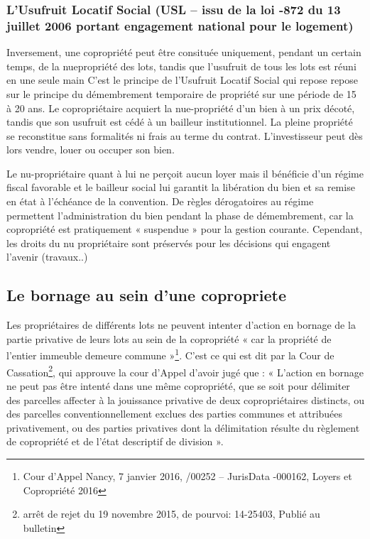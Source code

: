 		\subsubsection{L’Usufruit Locatif Social (USL -- issu de la loi -872 du 13 juillet 2006 portant engagement national pour le logement)}
		
			Inversement, une copropriété peut être consituée uniquement, pendant un certain temps, de la nuepropriété
			des lots, tandis que l’usufruit de tous les lots est réuni en une seule main
			C’est le principe de l’Usufruit Locatif Social qui repose repose sur le principe du démembrement
			temporaire de propriété sur une période de 15 à 20 ans. Le copropriétaire acquiert la nue-propriété d’un
			bien à un prix décoté, tandis que son usufruit est cédé à un bailleur institutionnel. La pleine propriété se
			reconstitue sans formalités ni frais au terme du contrat. L’investisseur peut dès lors vendre, louer ou
			occuper son bien.
			
			Le nu-propriétaire quant à lui ne perçoit aucun loyer mais il bénéficie d’un régime fiscal favorable et le
			bailleur social lui garantit la libération du bien et sa remise en état à l’échéance de la convention.
			De règles dérogatoires au régime permettent l’administration du bien pendant la phase de
			démembrement, car la copropriété est pratiquement « suspendue » pour la gestion courante. Cependant,
			les droits du nu propriétaire sont préservés pour les décisions qui engagent l’avenir (travaux..)

	\subsection{Le bornage au sein d’une copropriete}
	
		Les propriétaires de différents lots ne peuvent intenter d’action en bornage de la partie privative de leurs
		lots au sein de la copropriété « car la propriété de l’entier immeuble demeure commune »\footnote{
		Cour d'Appel Nancy, 7 janvier 2016, /00252 – JurisData -000162, Loyers et Copropriété 2016 
		}.
		C’est ce qui est dit par la Cour de Cassation\footnote{arrêt de rejet du 19 novembre 2015, \no de pourvoi: 14-25403, Publié au bulletin
		}, qui approuve la cour d’Appel d’avoir jugé que :
		« L'action en bornage ne peut pas être intenté dans une même copropriété, que se soit pour délimiter des
		parcelles affecter à la jouissance privative de deux copropriétaires distincts, ou des parcelles
		conventionnellement exclues des parties communes et attribuées privativement, ou des parties privatives
		dont la délimitation résulte du règlement de copropriété et de l'état descriptif de division ».